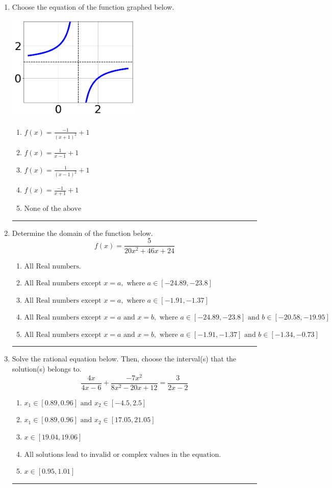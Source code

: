 \documentclass[14pt]{extbook}
\newcommand{\litem}[1]{\item#1\hspace*{-1cm}\rule{\textwidth}{0.4pt}}
\begin{document}
\begin{enumerate}
{\begin{enumerate}[label=\Alph*.]
\end{enumerate} }
\litem{
Choose the equation of the function graphed below.
\begin{center}
    \includegraphics[width=0.5\textwidth]{../Figures/rationalGraphToEquationA.png}
\end{center}
\begin{enumerate}[label=\Alph*.]
\item \( f(x) = \frac{-1}{(x + 1)^2} + 1 \)
\item \( f(x) = \frac{1}{x - 1} + 1 \)
\item \( f(x) = \frac{1}{(x - 1)^2} + 1 \)
\item \( f(x) = \frac{-1}{x + 1} + 1 \)
\item \( \text{None of the above} \)

\end{enumerate} }
\litem{
Determine the domain of the function below.\[ f(x) = \frac{5}{20x^{2} +46 x + 24} \]\begin{enumerate}[label=\Alph*.]
\item \( \text{All Real numbers.} \)
\item \( \text{All Real numbers except } x = a, \text{ where } a \in [-24.89, -23.8] \)
\item \( \text{All Real numbers except } x = a, \text{ where } a \in [-1.91, -1.37] \)
\item \( \text{All Real numbers except } x = a \text{ and } x = b, \text{ where } a \in [-24.89, -23.8] \text{ and } b \in [-20.58, -19.95] \)
\item \( \text{All Real numbers except } x = a \text{ and } x = b, \text{ where } a \in [-1.91, -1.37] \text{ and } b \in [-1.34, -0.73] \)

\end{enumerate} }
\litem{
Solve the rational equation below. Then, choose the interval(s) that the solution(s) belongs to.\[ \frac{4x}{4x -6} + \frac{-7x^{2}}{8x^{2} -20 x + 12} = \frac{3}{2x -2} \]\begin{enumerate}[label=\Alph*.]
\item \( x_1 \in [0.89, 0.96] \text{ and } x_2 \in [-4.5,2.5] \)
\item \( x_1 \in [0.89, 0.96] \text{ and } x_2 \in [17.05,21.05] \)
\item \( x \in [19.04,19.06] \)
\item \( \text{All solutions lead to invalid or complex values in the equation.} \)
\item \( x \in [0.95,1.01] \)


\end{enumerate}}
\end{enumerate}
\end{document}
